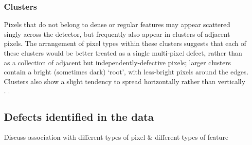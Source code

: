 \documentclass[\main/IO-Pixels.tex]{subfiles}
\begin{document}
\subsubsection{Clusters}

Pixels that do not belong to dense or regular features may appear scattered singly across the detector, but frequently also appear in clusters of adjacent pixels. The arrangement of pixel types within these clusters suggests that each of these clusters would be better treated as a single multi-pixel defect, rather than as a collection of adjacent but independently-defective pixels; larger clusters contain a bright (sometimes dark) `root', with less-bright pixels around the edges. Clusters also show a slight tendency to spread horizontally rather than vertically . .


\subsection{Defects identified in the data}



Discuss association with different types of pixel \& different types of feature
\end{document}
